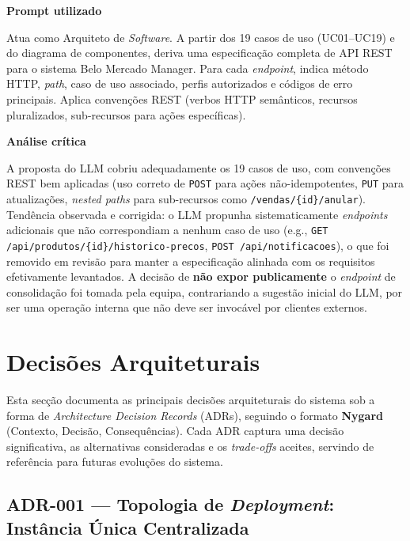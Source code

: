     \begin{tcolorbox}[title=Interação com o LLM]
    \textbf{Prompt utilizado}

    Atua como Arquiteto de \textit{Software}. A partir dos 19 casos de uso (UC01--UC19) e do diagrama de componentes, deriva uma especificação completa de API REST para o sistema Belo Mercado Manager. Para cada \textit{endpoint}, indica método HTTP, \textit{path}, caso de uso associado, perfis autorizados e códigos de erro principais. Aplica convenções REST (verbos HTTP semânticos, recursos pluralizados, sub-recursos para ações específicas).

    \tcblower

    \textbf{Análise crítica}

    A proposta do LLM cobriu adequadamente os 19 casos de uso, com convenções REST bem aplicadas (uso correto de \texttt{POST} para ações não-idempotentes, \texttt{PUT} para atualizações, \textit{nested paths} para sub-recursos como \texttt{/vendas/\{id\}/anular}). Tendência observada e corrigida: o LLM propunha sistematicamente \textit{endpoints} adicionais que não correspondiam a nenhum caso de uso (e.g., \texttt{GET /api/produtos/\{id\}/historico-precos}, \texttt{POST /api/notificacoes}), o que foi removido em revisão para manter a especificação alinhada com os requisitos efetivamente levantados. A decisão de \textbf{não expor publicamente} o \textit{endpoint} de consolidação foi tomada pela equipa, contrariando a sugestão inicial do LLM, por ser uma operação interna que não deve ser invocável por clientes externos.
    \end{tcolorbox}

\section{Decisões Arquiteturais}
\label{sec:adrs}

    Esta secção documenta as principais decisões arquiteturais do sistema sob a forma de \textit{Architecture Decision Records} (ADRs), seguindo o formato \textbf{Nygard} (Contexto, Decisão, Consequências). Cada ADR captura uma decisão significativa, as alternativas consideradas e os \textit{trade-offs} aceites, servindo de referência para futuras evoluções do sistema.

\subsection*{ADR-001 --- Topologia de \textit{Deployment}: Instância Única Centralizada}

